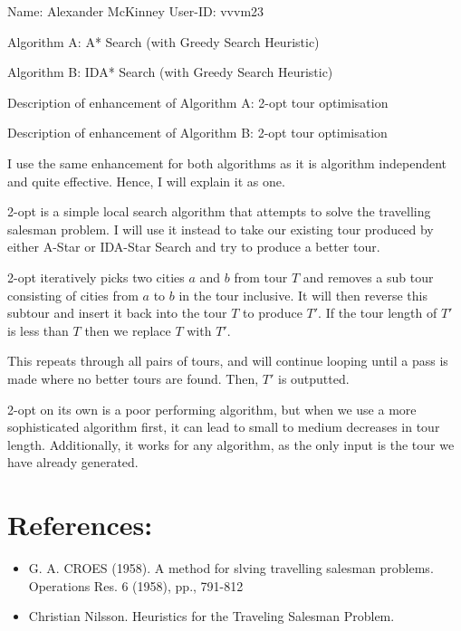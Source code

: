 \documentclass[11pt,a4paper]{article}
\begin{document}
Name: Alexander McKinney \hspace{200pt} User-ID: vvvm23

Algorithm A: A* Search (with Greedy Search Heuristic)

Algorithm B: IDA* Search (with Greedy Search Heuristic)

\vspace{10pt}

Description of enhancement of Algorithm A: 2-opt tour optimisation

Description of enhancement of Algorithm B: 2-opt tour optimisation

\vspace{10pt}

I use the same enhancement for both algorithms as it is algorithm independent and quite effective. Hence, I will explain it as one.

\vspace{5pt}

\noindent\hrulefill

\vspace{5pt}

2-opt is a simple local search algorithm that attempts to solve the travelling salesman problem. I will use it instead to take our existing tour produced by either A-Star or IDA-Star Search and try to produce a better tour.

2-opt iteratively picks two cities $a$ and $b$ from tour $T$ and removes a sub tour consisting of cities from $a$ to $b$ in the tour inclusive. It will then reverse this subtour and insert it back into the tour $T$ to produce $T'$. If the tour length of $T'$ is less than $T$ then we replace $T$ with $T'$.

This repeats through all pairs of tours, and will continue looping until a pass is made where no better tours are found. Then, $T'$ is outputted.

2-opt on its own is a poor performing algorithm, but when we use a more sophisticated algorithm first, it can lead to small to medium decreases in tour length. Additionally, it works for any algorithm, as the only input is the tour we have already generated.

\vspace{5pt}

\noindent\hrulefill

\vspace{5pt}

\section*{References:}

\begin{itemize}
	\item G. A. CROES (1958). A method for slving travelling salesman problems. Operations Res. 6 (1958), pp., 791-812 
\item Christian Nilsson. Heuristics for the Traveling Salesman Problem.
\end{itemize}
\end{document}
